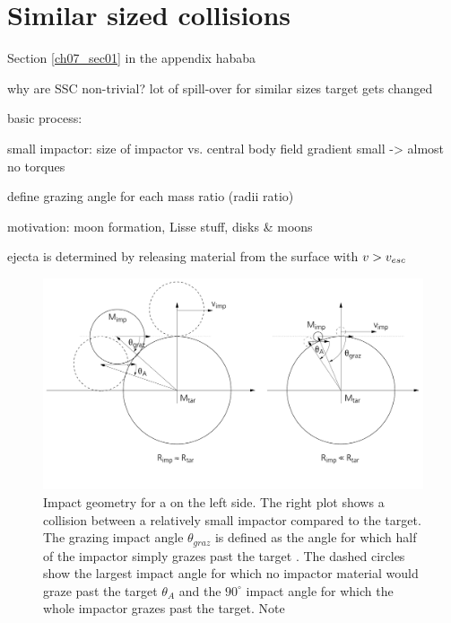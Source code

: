 \newpage
\chapter{Similar sized collisions}
\graphicspath{{./03figs/}}

Section \ref{ch07_sec01} in the appendix hababa

why are SSC non-trivial?
lot of spill-over for similar sizes
target gets changed

basic process: 

small impactor: size of impactor vs. central body field gradient small -> almost no torques

define grazing angle for each mass ratio (radii ratio)

motivation: moon formation, Lisse stuff, disks \& moons

ejecta is determined by releasing material from the surface with $v > v_{esc}$






\begin{figure}[htbp]
\begin{center}
\includegraphics[scale=0.4]{03_grazing}
\caption{Impact geometry for a \SSC on the left side. The right plot shows a collision between a relatively small impactor compared to the target. The grazing impact angle $\theta_{graz}$ is defined as the angle for which half of the impactor simply grazes past the target \citep{Asphaug:2010p3539}. The dashed circles show the largest impact angle for which no impactor material would graze past the target $\theta_A$ and the $90^\circ$ impact angle for which the whole impactor grazes past the target. Note }
\label{ch03_fig01}
\end{center}
\end{figure}

